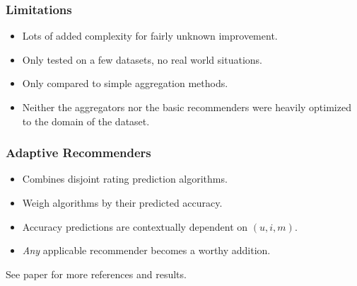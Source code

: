 \documentclass[screen]{beamer}
\begin{document}
\begin{frame}
  \frametitle{Limitations}
  \begin{itemize}
    \item Lots of added complexity for fairly unknown improvement.
    \item Only tested on a few datasets, no real world situations.
    \item Only compared to simple aggregation methods.
    \item Neither the aggregators nor the basic recommenders were
      heavily optimized to the domain of the dataset.
  \end{itemize}
\end{frame}

\begin{frame}
  \frametitle{Adaptive Recommenders}
  \begin{itemize}
    \item Combines disjoint rating prediction algorithms.
    \item Weigh algorithms by their predicted accuracy.
    \item Accuracy predictions are contextually dependent on $(u,i,m)$.
    \item \emph{Any} applicable recommender becomes a worthy addition.
  \end{itemize}
  \vspace{2em}
  See paper for more references and results.
\end{frame}
\end{document}
